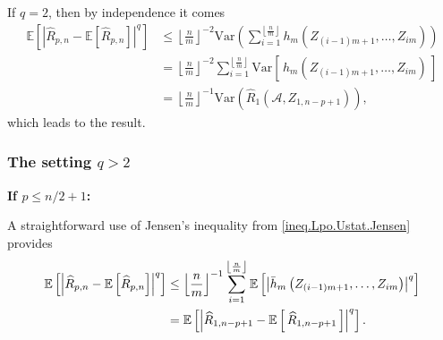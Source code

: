 \documentclass[twoside,11pt]{article}
\numberwithin{equation}{section}
\newcommand{\esp}[1]{\mathbb{E}\left[#1 \right]}
\newcommand{\floor}[1]{\left\lfloor #1 \right\rfloor}
\newcommand{\1}{\mathds{1}}%
\newcommand{\paren}[1]{\left( #1 \right)}
\newcommand{\croch}[1]{\left[\, #1 \,\right]}
\newcommand{\abs}[1]{\left\lvert #1 \right\rvert} %
\newcommand{\E}{\mathbb{E}}
\newcommand{\Var}{\mathrm{Var}}
\newcommand{\Rh}{\widehat{R}}
\newcommand{\A}{\mathcal{A}}
\numberwithin{equation}{section}
\theoremstyle{plain}
\begin{document}
If $q=2$, then by independence it comes
\begin{align*}
\esp{ \abs{ \Rh_{p,n} - \esp{\Rh_{p,n}} }^{q}  }
%
& \leq \floor{ \frac{n}{m}}^{-2} \Var\paren{  \sum_{i = 1} ^{\floor{ \frac{n}{m}}}  h_m\paren{ Z_{(i-1)m+1},\ldots,Z_{im}}  } \\
%
& = \floor{ \frac{n}{m}}^{-2} \sum_{i = 1} ^{\floor{ \frac{n}{m}}} \Var\croch{  h_m\paren{ Z_{(i-1)m+1},\ldots,Z_{im}}  } \\
%
& =    \floor{ \frac{n}{m}}^{-1}  \Var\paren{  \Rh_1(\A,Z_{1,n-p+1}) } ,
\end{align*}
which leads to the result.









\subsubsection{The setting $q>2$}


\noindent\textbf{If $p\leq n/2+1$:}

A straightforward use of Jensen's inequality from \eqref{ineq.Lpo.Ustat.Jensen} provides
\begin{align*}
\esp{ \abs{ \Rh_{p,n} - \esp{\Rh_{p,n}} }^{q}  }
%
 & \leq \floor{ \frac{n}{m}}^{-1} \sum_{i = 1} ^{\floor{ \frac{n}{m}}}  \esp{ \abs{    \bar h_m\paren{ Z_{(i-1)m+1},\ldots,Z_{im}} }^{q}  } \\
%
 & = \esp{ \abs{  \Rh_{1,n-p+1} -\E\croch{\Rh_{1,n-p+1} } }^{q}  } . \hfill
\end{align*}
\end{document}
